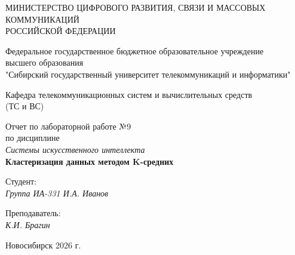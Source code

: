 \thispagestyle{empty}

\begin{center}
    МИНИСТЕРСТВО ЦИФРОВОГО РАЗВИТИЯ, СВЯЗИ И МАССОВЫХ КОММУНИКАЦИЙ \\
    РОССИЙСКОЙ ФЕДЕРАЦИИ
    
    \vspace{20pt}
    
    Федеральное государственное бюджетное образовательное учреждение \\
    высшего образования \\
    "Сибирский государственный университет телекоммуникаций и информатики" \\
    
    \vspace{20pt}
    
    Кафедра телекоммуникационных систем и вычислительных средств \\
    (ТС и ВС)
\end{center}

\vfill

\begin{center}
    Отчет по лабораторной работе №9 \\
    по дисциплине \\
    \textit{Системы искусственного интеллекта} \\
    \vspace{10pt}
    \textbf{Кластеризация данных методом K-средних}
    \vspace{20pt}
\end{center}

\vfill

\noindent Студент: \\
\textit{Группа ИА-331 \hfill И.А. Иванов}

\vspace{20pt}

\noindent Преподаватель: \\
\textit{\hfill К.И. Брагин}

\vfill

\begin{center}
    Новосибирск 2026 г.
\end{center}
\endinput